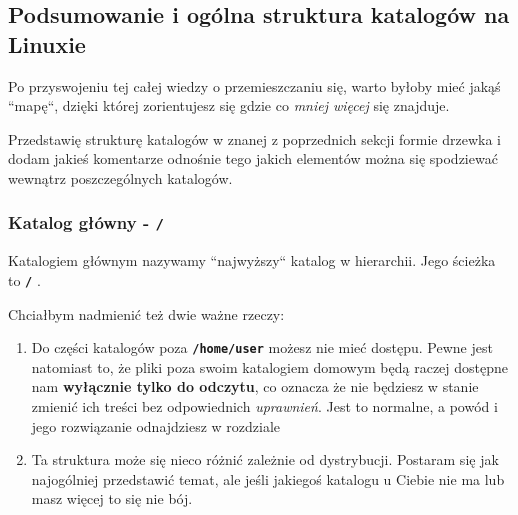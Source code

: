\documentclass[12pt]{article}
\newcommand{\ttbf}[1]{
    \texttt{\textbf{#1}}
}
\begin{document}
\subsection{Podsumowanie i ogólna struktura katalogów na Linuxie}

Po przyswojeniu tej całej wiedzy o przemieszczaniu się, warto byłoby mieć jakąś ``mapę``, dzięki której zorientujesz się gdzie co \emph{mniej więcej} się znajduje.

Przedstawię strukturę katalogów w znanej z poprzednich sekcji formie drzewka i dodam jakieś komentarze odnośnie tego jakich elementów można się spodziewać wewnątrz poszczególnych katalogów.

\subsubsection{Katalog główny - \ttbf{/}}

Katalogiem głównym nazywamy ``najwyższy`` katalog w hierarchii. Jego ścieżka to \ttbf{/}.

Chciałbym nadmienić też dwie ważne rzeczy:

\begin{enumerate}
    \item Do części katalogów poza \ttbf{/home/user} możesz nie mieć dostępu. Pewne jest natomiast to, że pliki poza swoim katalogiem domowym będą raczej dostępne nam \textbf{wyłącznie tylko do odczytu}, co oznacza że nie będziesz w stanie zmienić ich treści bez odpowiednich \emph{uprawnień}. Jest to normalne, a powód i jego rozwiązanie odnajdziesz w rozdziale 
    \item Ta struktura może się nieco różnić zależnie od dystrybucji. Postaram się jak najogólniej przedstawić temat, ale jeśli jakiegoś katalogu u Ciebie nie ma lub masz więcej to się nie bój.
\end{enumerate}
\end{document}
